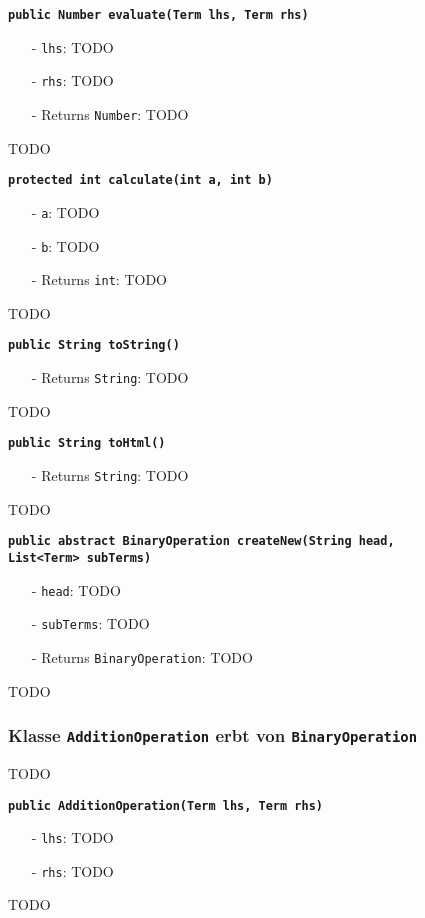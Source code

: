 \documentclass[parskip=full,11pt,twoside]{scrartcl}
\begin{document}
\textbf{\texttt{public Number evaluate(Term lhs, Term rhs)}}
\begin{itemize}[noitemsep]
	\item[-] \texttt{lhs}: TODO
	\item[-] \texttt{rhs}: TODO
	\item[-] Returns \texttt{Number}: TODO
\end{itemize}
TODO

\textbf{\texttt{protected int calculate(int a, int b)}}
\begin{itemize}[noitemsep]
	\item[-] \texttt{a}: TODO
	\item[-] \texttt{b}: TODO
	\item[-] Returns \texttt{int}: TODO
\end{itemize}
TODO

\textbf{\texttt{public String toString()}}
\begin{itemize}[noitemsep]
	\item[-] Returns \texttt{String}: TODO
\end{itemize}
TODO

\textbf{\texttt{public String toHtml()}}
\begin{itemize}[noitemsep]
	\item[-] Returns \texttt{String}: TODO
\end{itemize}
TODO

\textbf{\texttt{public abstract BinaryOperation createNew(String head,\\List<Term> subTerms)}}
\begin{itemize}[noitemsep]
	\item[-] \texttt{head}: TODO
	\item[-] \texttt{subTerms}: TODO
	\item[-] Returns \texttt{BinaryOperation}: TODO
\end{itemize}
TODO

\subsubsection{Klasse \texttt{AdditionOperation} erbt von \texttt{BinaryOperation}}
TODO

\textbf{\texttt{public AdditionOperation(Term lhs, Term rhs)}}
\begin{itemize}[noitemsep]
	\item[-] \texttt{lhs}: TODO
	\item[-] \texttt{rhs}: TODO
\end{itemize}
TODO
\end{document}
